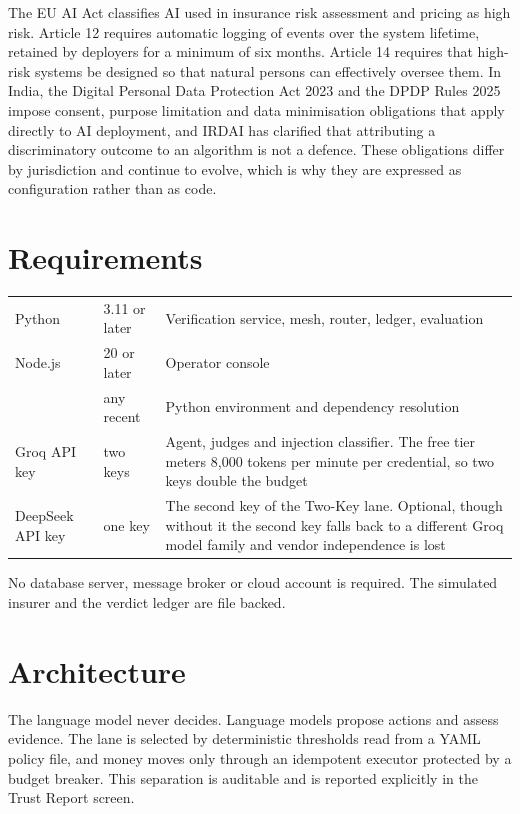 \documentclass[10pt]{article}
\begin{document}
The EU AI Act classifies AI used in insurance risk assessment and pricing as high risk.
Article 12 requires automatic logging of events over the system lifetime, retained by
deployers for a minimum of six months. Article 14 requires that high-risk systems be
designed so that natural persons can effectively oversee them. In India, the Digital
Personal Data Protection Act 2023 and the DPDP Rules 2025 impose consent, purpose
limitation and data minimisation obligations that apply directly to AI deployment, and
IRDAI has clarified that attributing a discriminatory outcome to an algorithm is not a
defence. These obligations differ by jurisdiction and continue to evolve, which is why
they are expressed as configuration rather than as code.

\section{Requirements}

\vspace{2pt}
{\small
\begin{xltabular}{\textwidth}{@{}L{0.22\textwidth}L{0.20\textwidth}Y@{}}
\toprule
{} &  &  \\
\midrule
Python & 3.11 or later & Verification service, mesh, router, ledger, evaluation \\
Node.js & 20 or later & Operator console \\
 & any recent & Python environment and dependency resolution \\
Groq API key & two keys & Agent, judges and injection classifier. The free tier meters 8,000 tokens per minute per credential, so two keys double the budget \\
DeepSeek API key & one key & The second key of the Two-Key lane. Optional, though without it the second key falls back to a different Groq model family and vendor independence is lost \\
\bottomrule
\end{xltabular}}

No database server, message broker or cloud account is required. The simulated insurer
and the verdict ledger are file backed.

\section{Architecture}

\begin{callout}
The language model never decides. Language models propose actions and assess evidence.
The lane is selected by deterministic thresholds read from a YAML policy file, and money
moves only through an idempotent executor protected by a budget breaker. This separation
is auditable and is reported explicitly in the Trust Report screen.
\end{callout}
\end{document}
